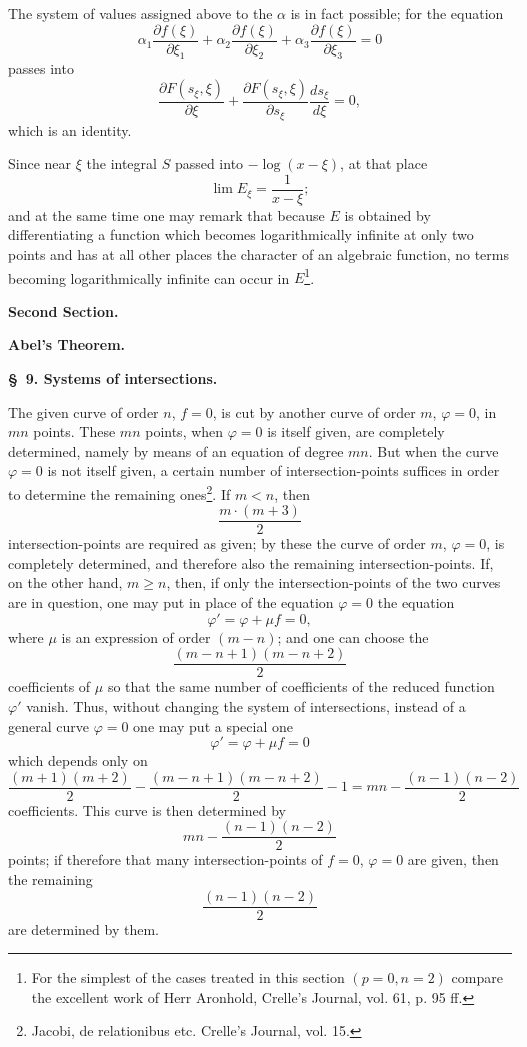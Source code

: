 \documentclass[10pt]{article}
\begin{document}
The system of values assigned above to the $\alpha$ is in fact possible; for the equation
\[
\alpha_1\frac{\partial f(\xi)}{\partial \xi_1}+\alpha_2\frac{\partial f(\xi)}{\partial \xi_2}+\alpha_3\frac{\partial f(\xi)}{\partial \xi_3}=0
\]
passes into
\[
\frac{\partial F(s_\xi,\xi)}{\partial \xi}
+\frac{\partial F(s_\xi,\xi)}{\partial s_\xi}\frac{ds_\xi}{d\xi}=0,
\]
which is an identity.

Since near $\xi$ the integral $S$ passed into $-\log(x-\xi)$, at that place
\[
\lim E_\xi=\frac{1}{x-\xi};
\]
and at the same time one may remark that because $E$ is obtained by differentiating a function which becomes logarithmically infinite at only two points and has at all other places the character of an algebraic function, no terms becoming logarithmically infinite can occur in $E$\footnote{For the simplest of the cases treated in this section $(p=0,n=2)$ compare the excellent work of Herr Aronhold, Crelle's Journal, vol. 61, p. 95 ff.}.

\clearpage

\begin{center}
{\large\bfseries Second Section.}\par\vspace{0.8em}
{\Large\bfseries Abel's Theorem.}
\end{center}

\begin{center}
{\bfseries \S\ 9. Systems of intersections.}
\end{center}

The given curve of order $n$, $f=0$, is cut by another curve of order $m$, $\varphi=0$, in $mn$ points. These $mn$ points, when $\varphi=0$ is itself given, are completely determined, namely by means of an equation of degree $mn$. But when the curve $\varphi=0$ is not itself given, a certain number of intersection-points suffices in order to determine the remaining ones\footnote{Jacobi, de relationibus etc. Crelle's Journal, vol. 15.}. If $m<n$, then
\[
\frac{m\cdot(m+3)}{2}
\]
intersection-points are required as given; by these the curve of order $m$, $\varphi=0$, is completely determined, and therefore also the remaining intersection-points. If, on the other hand, $m\geq n$, then, if only the intersection-points of the two curves are in question, one may put in place of the equation $\varphi=0$ the equation
\[
\varphi'=\varphi+\mu f=0,
\]
where $\mu$ is an expression of order $(m-n)$; and one can choose the
\[
\frac{(m-n+1)(m-n+2)}{2}
\]
coefficients of $\mu$ so that the same number of coefficients of the reduced function $\varphi'$ vanish. Thus, without changing the system of intersections, instead of a general curve $\varphi=0$ one may put a special one
\[
\varphi'=\varphi+\mu f=0
\]
which depends only on
\[
\frac{(m+1)(m+2)}{2}-\frac{(m-n+1)(m-n+2)}{2}-1
=mn-\frac{(n-1)(n-2)}{2}
\]
coefficients. This curve is then determined by
\[
mn-\frac{(n-1)(n-2)}{2}
\]
points; if therefore that many intersection-points of $f=0$, $\varphi=0$ are given, then the remaining
\[
\frac{(n-1)(n-2)}{2}
\]
are determined by them.
\end{document}

